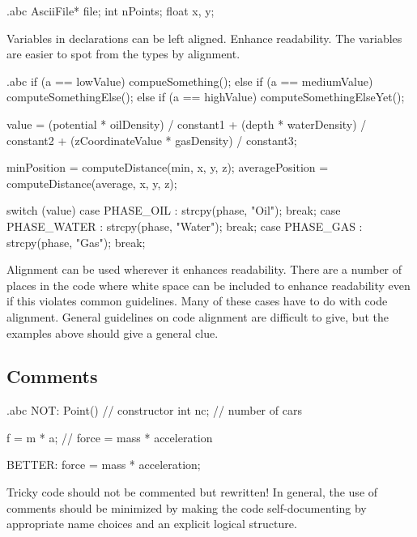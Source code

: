\begin{filecontents*}{\jobname.abc}
	AsciiFile* file;
	int        nPoints;
	float      x, y;
\end{filecontents*}

\recommendation
{Variables in declarations can be left aligned.}
{}
{Enhance readability. The variables are easier to spot from the types by alignment.}


\begin{filecontents*}{\jobname.abc}
	if      (a == lowValue)    compueSomething();
	else if (a == mediumValue) computeSomethingElse();
	else if (a == highValue)   computeSomethingElseYet();
	
	value = (potential * oilDensity)   / constant1 +
	(depth             * waterDensity) / constant2 +
	(zCoordinateValue  * gasDensity)   / constant3;
	
	minPosition     = computeDistance(min,     x, y, z);
	averagePosition = computeDistance(average, x, y, z);
	
	switch (value) {
		case PHASE_OIL   : strcpy(phase, "Oil");   break;
		case PHASE_WATER : strcpy(phase, "Water"); break;
		case PHASE_GAS   : strcpy(phase, "Gas");   break;
	}
\end{filecontents*}

\recommendation
{Alignment can be used wherever it enhances readability.}
{}
{There are a number of places in the code where white space can be included to enhance readability even if this violates common guidelines. Many of these cases have to do with code alignment. General guidelines on code alignment are difficult to give, but the examples above should give a general clue.}


\subsection{Comments}


\begin{filecontents*}{\jobname.abc}
	NOT: 
	Point() {} // constructor
	int nc; // number of cars
	
	f = m * a; // force = mass * acceleration
	
	BETTER:
	force = mass * acceleration;
\end{filecontents*}

\recommendation
{Tricky code should not be commented but rewritten!}
{}
{In general, the use of comments should be minimized by making the code self-documenting by appropriate name choices and an explicit logical structure.}

